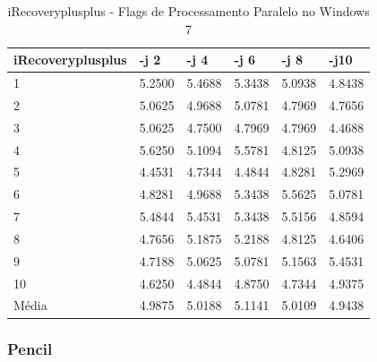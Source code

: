 \begin{table}[!ht]
\centering
\caption{iRecoveryplusplus - Flags de Processamento Paralelo no Windows 7}
\label{tab:flag_processamento_paralelo:windows:irecoveryplusplus}
\begin{tabular}{llllll}
\textbf{iRecoveryplusplus} & \textbf{-j 2} & \textbf{-j 4} & \textbf{-j 6} & \textbf{-j 8} & \textbf{-j10}  \\ \toprule
1                          & 5.2500        &  5.4688       &  5.3438       & 5.0938        & 4.8438      \\ 
2                          & 5.0625        &  4.9688       &  5.0781       &  4.7969       &  4.7656     \\ 
3                          & 5.0625        &  4.7500       &  4.7969       &  4.7969       &  4.4688     \\ 
4                          & 5.6250        &  5.1094       &  5.5781       &  4.8125       &  5.0938     \\ 
5                          & 4.4531        &  4.7344       &  4.4844       &  4.8281       &  5.2969     \\ 
6                          & 4.8281        &  4.9688       &  5.3438       &  5.5625       &  5.0781     \\ 
7                          & 5.4844        &  5.4531       &  5.3438       &  5.5156       &  4.8594     \\ 
8                          & 4.7656        &  5.1875       &  5.2188       &  4.8125       &  4.6406     \\ 
9                          & 4.7188        &  5.0625       &  5.0781       &  5.1563       &  5.4531     \\ 
10                         & 4.6250        &  4.4844       &  4.8750       &  4.7344       &  4.9375     \\ \bottomrule
Média                      & 4.9875        &  5.0188       &  5.1141       &  5.0109       &  4.9438     \\ 
\end{tabular}
\end{table}

\clearpage
\subsubsection*{Pencil}

